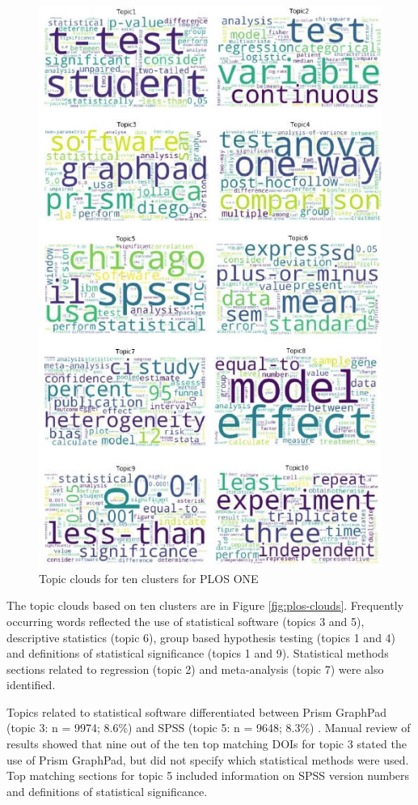 \documentclass[12pt]{article}
\begin{document}
\begin{figure}

{\centering \includegraphics[width=0.8\linewidth]{figures/ploswordclouds.jpg} 

}

\caption{\label{fig:plos-clouds}Topic clouds for ten clusters for PLOS ONE}\label{fig:unnamed-chunk-5}
\end{figure}

The topic clouds based on ten clusters are in Figure
\ref{fig:plos-clouds}. Frequently occurring words reflected the use of
statistical software (topics 3 and 5), descriptive statistics (topic 6),
group based hypothesis testing (topics 1 and 4) and definitions of
statistical significance (topics 1 and 9). Statistical methods sections
related to regression (topic 2) and meta-analysis (topic 7) were also
identified.

Topics related to statistical software differentiated between Prism
GraphPad (topic 3: n = 9974; 8.6\%) and SPSS (topic 5: n = 9648; 8.3\%)
. Manual review of results showed that nine out of the ten top matching
DOIs for topic 3 stated the use of Prism GraphPad, but did not specify
which statistical methods were used. Top matching sections for topic 5
included information on SPSS version numbers and definitions of
statistical significance.
\end{document}
